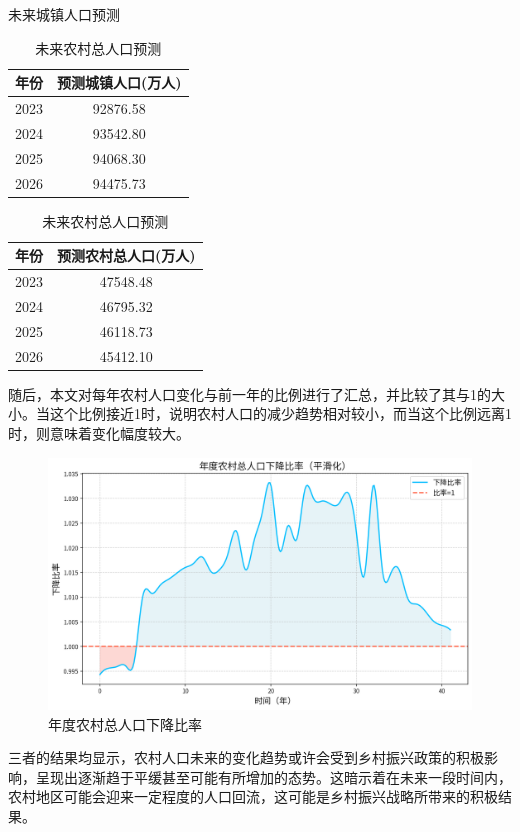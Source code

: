 \begin{table}[h]
    \centering
    \begin{minipage}{0.48\linewidth}
        \centering
        \caption{未来城镇人口预测}
        \label{tab:urban_population_prediction}
        \begin{tabular}{cc}
        \hline
        年份 & 预测城镇人口(万人) \\
        \hline
        2023 & 92876.58 \\
        2024 & 93542.80 \\
        2025 & 94068.30 \\
        2026 & 94475.73 \\
        \hline
        \end{tabular}
    \end{minipage}\hfill
    \begin{minipage}{0.48\linewidth}
        \centering
        \caption{未来农村总人口预测}
        \label{tab:rural_population_prediction}
        \begin{tabular}{cc}
        \hline
        年份 & 预测农村总人口(万人) \\
        \hline
        2023 & 47548.48 \\
        2024 & 46795.32 \\
        2025 & 46118.73 \\
        2026 & 45412.10 \\
        \hline
        \end{tabular}
    \end{minipage}
\end{table}



随后，本文对每年农村人口变化与前一年的比例进行了汇总，并比较了其与1的大小。当这个比例接近1时，说明农村人口的减少趋势相对较小，而当这个比例远离1时，则意味着变化幅度较大。

\begin{figure}[H]
    \centering
    \includegraphics[width=0.65\linewidth]{figures/37.png}
    \caption{年度农村总人口下降比率}
    \label{fig:enter-label}
\end{figure}
三者的结果均显示，农村人口未来的变化趋势或许会受到乡村振兴政策的积极影响，呈现出逐渐趋于平缓甚至可能有所增加的态势。这暗示着在未来一段时间内，农村地区可能会迎来一定程度的人口回流，这可能是乡村振兴战略所带来的积极结果。

